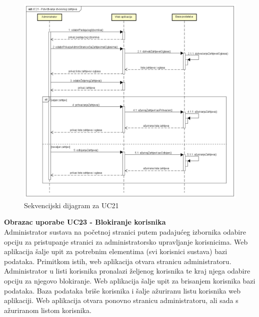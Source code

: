 				\begin{figure}[htb]
					\centering
					\includegraphics[width=14cm]{slike/Sekvencijski dijagram - UC21}
					\caption{Sekvencijski dijagram za UC21}
					\label{fig:Sekvencijski-UC21}
				\end{figure}
				\eject	
				
				\textbf{Obrazac uporabe UC23 - Blokiranje korisnika}\\
				
				Administrator sustava na početnoj stranici putem padajućeg izbornika odabire opciju za pristupanje stranici za administratorsko upravljanje korisnicima. Web aplikacija šalje upit za potrebnim elementima (svi korisnici sustava) bazi podataka. Primitkom istih, web aplikacija otvara stranicu administratoru. Administrator u listi korisnika pronalazi željenog korisnika te kraj njega odabire opciju za njegovo blokiranje. Web aplikacija šalje upit za brisanjem korisnika bazi podataka. Baza podataka briše korisnika i šalje ažuriranu listu korisnika web aplikaciji. Web aplikacija otvara ponovno stranicu administratoru, ali sada s ažuriranom listom korisnika.
				
